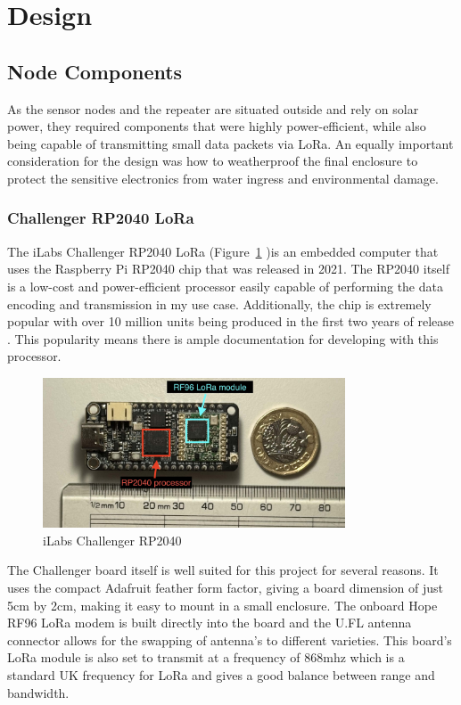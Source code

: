 \section{Design}

\subsection{Node Components}

As the sensor nodes and the repeater are situated outside and rely on solar
power, they required components that were highly power-efficient, while also
being capable of transmitting small data packets via LoRa. An equally important
consideration for the design was how to weatherproof the final enclosure to
protect the sensitive electronics from water ingress and environmental damage.

\subsubsection{Challenger RP2040 LoRa}

The iLabs Challenger RP2040 LoRa (Figure~\ref{fig:challenger-rp2040} )is an
embedded computer that uses the Raspberry Pi RP2040 chip that was released in
2021. The RP2040 itself is a low-cost and power-efficient processor easily
capable of performing the data encoding and transmission in my use case.
Additionally, the chip is extremely popular with over 10 million units being
produced in the first two years of release \cite{pounder2023}. This popularity
means there is ample documentation for developing with this processor.

\begin{figure}[H]
    \centering
    \includegraphics[width=0.8\textwidth]{contents/part-2/fig2/challenger-rp2040.jpg}
    \caption{iLabs Challenger RP2040}
    \label{fig:challenger-rp2040}
\end{figure}

The Challenger board itself is well suited for this project for several reasons.
It uses the compact Adafruit feather form factor, giving a board dimension of
just 5cm by 2cm, making it easy to mount in a small enclosure. The onboard Hope
RF96 LoRa modem is built directly into the board and the U.FL antenna connector
allows for the swapping of antenna's to different varieties. This board's LoRa
module is also set to transmit at a frequency of 868mhz which is a standard UK
frequency for LoRa and gives a good balance between range and bandwidth.

